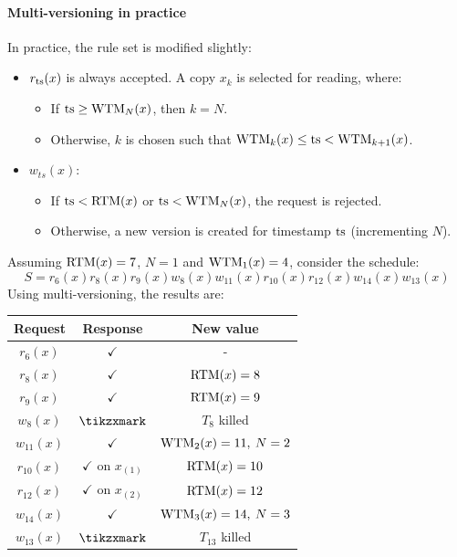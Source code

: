 \paragraph*{Multi-versioning in practice}
In practice, the rule set is modified slightly:
\begin{itemize}
    \item $r_{\textnormal{ts}}(x)$ is always accepted. A copy $x_k$ is selected for reading, where:
        \begin{itemize}
            \item If $\textnormal{ts} \geq \textnormal{WTM}_N(x)$, then $k=N$. 
            \item  Otherwise, $k$ is chosen such that $\textnormal{WTM}_k(x) \leq \textnormal{ts} < \textnormal{WTM}_{k+1}(x)$. 
        \end{itemize}
    \item $w_{ts}(x)$:
        \begin{itemize}
            \item If $\textnormal{ts} < \textnormal{RTM}(x)$ or $\textnormal{ts} < \textnormal{WTM}_N(x)$, the request is rejected. 
            \item  Otherwise, a new version is created for timestamp $\textnormal{ts}$ (incrementing $N$).
        \end{itemize}
\end{itemize}
\begin{example}
    Assuming $\textnormal{RTM}(x)=7$, $N=1$ and $\textnormal{WTM}_1(x)=4$, consider the schedule:
    \[S=r_6(x) r_8(x) r_9(x) w_8(x) w_{11}(x) r_{10}(x) r_{12}(x) w_{14}(x) w_{13}(x)\]
    Using multi-versioning, the results are:
    \begin{table}[H]
        \centering
        \begin{tabular}{ccc}
        \textbf{Request} & \textbf{Response}         & \textbf{New value}  \\ \hline
        $r_6(x)$         & $\checkmark$              & -                   \\
        $r_8(x)$         & $\checkmark$              & $\textnormal{RTM}(x)=8$          \\
        $r_9(x)$         & $\checkmark$              & $\textnormal{RTM}(x)=9$          \\
        $w_8(x)$         & $\tikzxmark$              & $T_8$ killed        \\
        $w_{11}(x)$      & $\checkmark$              & $\textnormal{WTM}_2(x)=11,\:N=2$ \\
        $r_{10}(x)$      & $\checkmark$ on $x_{(1)}$ & $\textnormal{RTM}(x)=10$         \\
        $r_{12}(x)$      & $\checkmark$ on $x_{(2)}$ & $\textnormal{RTM}(x)=12$         \\
        $w_{14}(x)$      & $\checkmark$              & $\textnormal{WTM}_3(x)=14,\:N=3$ \\
        $w_{13}(x)$      & $\tikzxmark$              & $T_{13}$ killed
        \end{tabular}
    \end{table}
\end{example}

